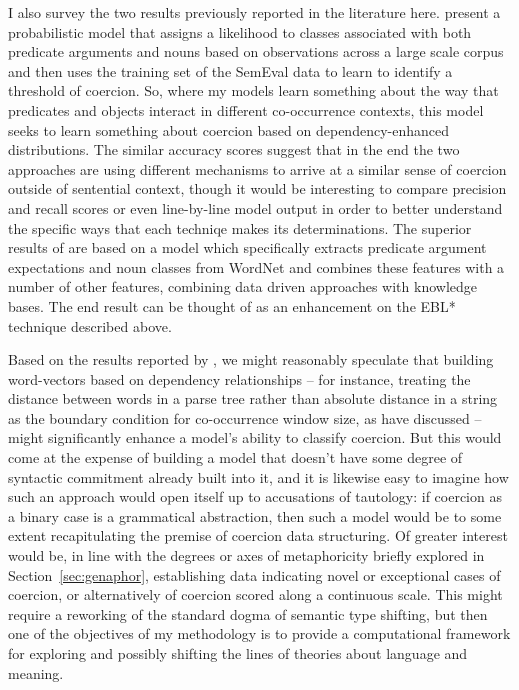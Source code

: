 I also survey the two results previously reported in the literature here.  \cite{RobertsEA2011} present a probabilistic model that assigns a likelihood to classes associated with both predicate arguments and nouns based on observations across a large scale corpus and then uses the training set of the SemEval data to learn to identify a threshold of coercion.  So, where my models learn something about the way that predicates and objects interact in different co-occurrence contexts, this model seeks to learn something about coercion based on dependency-enhanced distributions.  The similar accuracy scores suggest that in the end the two approaches are using different mechanisms to arrive at a similar sense of coercion outside of sentential context, though it would be interesting to compare precision and recall scores or even line-by-line model output in order to better understand the specific ways that each techniqe makes its determinations.  The superior results of \cite{RobertsEA2010} are based on a model which specifically extracts predicate argument expectations and noun classes from WordNet and combines these features with a number of other features, combining data driven approaches with knowledge bases.  The end result can be thought of as an enhancement on the \textsc{EBL*} technique described above.

Based on the results reported by \cite{RobertsEA2011}, we might reasonably speculate that building word-vectors based on dependency relationships -- for instance, treating the distance between words in a parse tree rather than absolute distance in a string as the boundary condition for co-occurrence window size, as \cite{PadoEA2007} have discussed -- might significantly enhance a model's ability to classify coercion.  But this would come at the expense of building a model that doesn't have some degree of syntactic commitment already built into it, and it is likewise easy to imagine how such an approach would open itself up to accusations of tautology: if coercion as a binary case is a grammatical abstraction, then such a model would be to some extent recapitulating the premise of coercion data structuring.  Of greater interest would be, in line with the degrees or axes of metaphoricity briefly explored in Section~\ref{sec:genaphor}, establishing data indicating novel or exceptional cases of coercion, or alternatively of coercion scored along a continuous scale.  This might require a reworking of the standard dogma of semantic type shifting, but then one of the objectives of my methodology is to provide a computational framework for exploring and possibly shifting the lines of theories about language and meaning.

